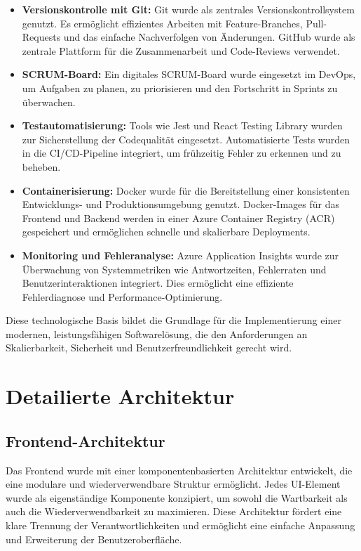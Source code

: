 \begin{itemize}
    \item \textbf{Versionskontrolle mit Git:} Git wurde als zentrales Versionskontrollsystem genutzt. Es ermöglicht effizientes Arbeiten mit Feature-Branches, Pull-Requests und das einfache Nachverfolgen von Änderungen. GitHub wurde als zentrale Plattform für die Zusammenarbeit und Code-Reviews verwendet.
    
    \item \textbf{SCRUM-Board:} Ein digitales SCRUM-Board wurde eingesetzt im DevOps, um Aufgaben zu planen, zu priorisieren und den Fortschritt in Sprints zu überwachen.

    \item \textbf{Testautomatisierung:} Tools wie Jest und React Testing Library wurden zur Sicherstellung der Codequalität eingesetzt. Automatisierte Tests wurden in die CI/CD-Pipeline integriert, um frühzeitig Fehler zu erkennen und zu beheben.

    \item \textbf{Containerisierung:} Docker wurde für die Bereitstellung einer konsistenten Entwicklungs- und Produktionsumgebung genutzt. Docker-Images für das Frontend und Backend werden in einer Azure Container Registry (ACR) gespeichert und ermöglichen schnelle und skalierbare Deployments.
    
    \item \textbf{Monitoring und Fehleranalyse:} Azure Application Insights wurde zur Überwachung von Systemmetriken wie Antwortzeiten, Fehlerraten und Benutzerinteraktionen integriert. Dies ermöglicht eine effiziente Fehlerdiagnose und Performance-Optimierung.
\end{itemize}

Diese technologische Basis bildet die Grundlage für die Implementierung einer modernen, leistungsfähigen Softwarelösung, die den Anforderungen an Skalierbarkeit, Sicherheit und Benutzerfreundlichkeit gerecht wird.

\section{Detailierte Architektur}
\subsection{Frontend-Architektur}
Das Frontend wurde mit einer komponentenbasierten Architektur entwickelt, die eine modulare und wiederverwendbare Struktur ermöglicht. Jedes UI-Element wurde als eigenständige Komponente konzipiert, um sowohl die Wartbarkeit als auch die Wiederverwendbarkeit zu maximieren. Diese Architektur fördert eine klare Trennung der Verantwortlichkeiten und ermöglicht eine einfache Anpassung und Erweiterung der Benutzeroberfläche.

